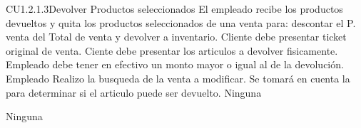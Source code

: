 \begin{UseCase} {CU1.2.1.3}{Devolver Productos seleccionados}{
	El empleado recibe los productos devueltos y quita los productos seleccionados de una venta para: descontar el P. venta del Total de venta y devolver a inventario.
}
	{
		\UCli Cliente debe presentar ticket original de venta.
		\UCli Ciente debe presentar los articulos a devolver fisicamente.
		\UCli Empleado debe tener en efectivo un monto mayor o igual al de la devolución.
		\UCli Empleado Realizo la busqueda de la venta a modificar.
		\UCli Se tomará en cuenta la  para determinar si el articulo puede ser devuelto.
	}
	{
		Ninguna
	}
	{
		\UCli {}
		\UCli {}
		\UCli {}
		\UCli {}
		\UCli {}
		\UCli {}
		
	}
	{
		Ninguna
	}
\end{UseCase}


